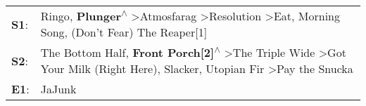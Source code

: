 \begin{supertabular}{p{0.03\textwidth}p{0.92\textwidth}}
 \textbf{S1}:  &                               Ringo\textsuperscript{}, \enspace \textbf{Plunger\textsuperscript{$\wedge$}} \textgreater \enspace Atmosfarag\textsuperscript{} \textgreater \enspace Resolution\textsuperscript{} \textgreater \enspace Eat\textsuperscript{}, \enspace Morning Song\textsuperscript{}, \enspace (Don't Fear) The Reaper[1]\textsuperscript{}  \enspace  \\
 \textbf{S2}:  &  The Bottom Half\textsuperscript{}, \enspace \textbf{Front Porch[2]\textsuperscript{$\wedge$}} \textgreater \enspace The Triple Wide\textsuperscript{} \textgreater \enspace Got Your Milk (Right Here)\textsuperscript{}, \enspace Slacker\textsuperscript{}, \enspace Utopian Fir\textsuperscript{} \textgreater \enspace Pay the Snucka\textsuperscript{}  \enspace  \\
 \textbf{E1}:  &                                                                                                                                                                                                                                                                                                                                     JaJunk\textsuperscript{}  \enspace  \\
\end{supertabular}
